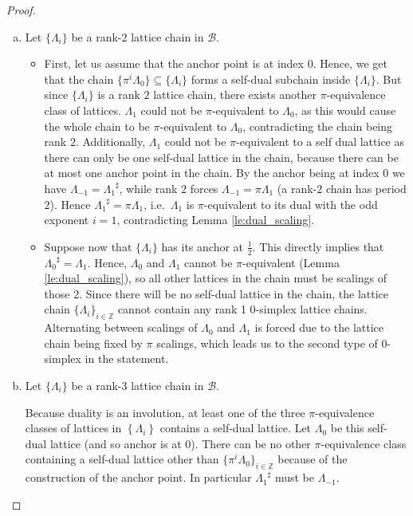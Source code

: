 \documentclass{eptcs}
\theoremstyle{remark}
\theoremstyle{definition}
\newcommand{\dual}[1]{{#1}^{\sharp}}
\begin{document}
\begin{proof}
\begin{enumerate}[(a)]
{    }
    \item Let $\{\Lambda_i\}$ be a rank-2 lattice chain in $\mathcal{B}$. 
	\begin{itemize}

	    \item 

        { First, let us assume that the anchor point is at index 0. Hence, we get that the chain $\{\pi^{i}\Lambda_{0}\} \subseteq \{\Lambda_{i}\}$ 
	forms a self-dual subchain inside $\{\Lambda_{i}\}$. 
	But since $\{\Lambda_{i}\}$ is a rank $2$ lattice chain, 
        there exists another $\pi$-equivalence class of lattices. $\Lambda_1$ could not be $\pi$-equivalent to $\Lambda_0$, as this would cause the whole chain to be $\pi$-equivalent to $\Lambda_0$, contradicting the chain being rank $2$. Additionally, $\Lambda_1$ could not be $\pi$-equivalent to a self dual lattice as there can only be one self-dual lattice in the chain, because there can be at most one anchor point in the chain. 
        By the anchor being at index $0$ we have $\Lambda_{-1} = \dual{\Lambda_1}$, while rank $2$ forces $\Lambda_{-1} = \pi \Lambda_1$ (a rank-$2$ chain has period $2$). Hence $\dual{\Lambda_1} = \pi \Lambda_1$, i.e.\ $\Lambda_1$ is $\pi$-equivalent to its dual with the odd exponent $i=1$, contradicting Lemma \ref{le:dual_scaling}.
        
}

\item 

Suppose now that $\{\Lambda_{i}\}$ has its anchor at $\frac{1}{2}$. This directly implies that $\dual{\Lambda_0} = \Lambda_1$. Hence, $\Lambda_0$ and $\Lambda_1$ cannot be $\pi$-equivalent (Lemma \ref{le:dual_scaling}), so all other lattices in the chain must be scalings of those 2. Since there will be no self-dual lattice in the chain, the lattice chain $\{\Lambda_i\}_{i \in \mathbb{Z}}$ 
cannot contain any rank 1 0-simplex lattice chains. Alternating between scalings of $\Lambda_0$ and $\Lambda_1$ is forced due to the lattice chain being fixed by $\pi$ scalings, which leads us to the second type of 0-simplex in the statement. 
	\end{itemize}
    \item Let $\{\Lambda_i\}$ be a rank-3 lattice chain in $\mathcal{B}$. 

	Because duality is an involution, at least one of the three $\pi$-equivalence classes of lattices in $\left\{\Lambda_{i}\right\}$ contains a self-dual lattice. 
    Let $\Lambda_{0}$ be this self-dual lattice (and so anchor is at 0). There can be no other $\pi$-equivalence class containing a self-dual lattice other than $\{\pi^i \Lambda_0\}_{i \in \mathbb{Z}}$ because of the construction of the anchor point. In particular $\dual{\Lambda_1}$ must be $\Lambda_{-1}$.
	

\end{enumerate}
\end{proof}
\end{document}
